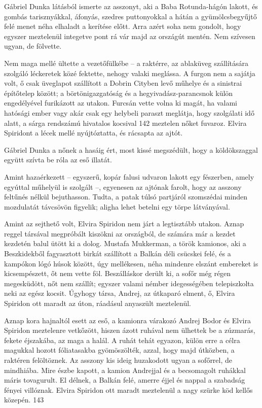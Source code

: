 \documentclass{IEEEtran}
\begin{document}
Gábriel Dunka látásból ismerte az asszonyt, aki a Baba Rotunda-hágón lakott,
és gombás tarisznyákkal, áfonyás, szedres puttonyokkal a hátán a
gyümölcsbegyűjtő felé menet néha elhaladt a kerítése előtt. Arra azért soha
nem gondolt, hogy egyszer meztelenül integetve pont rá vár majd az országút
mentén. Nem szívesen ugyan, de fölvette.

Nem maga mellé ültette a vezetőfülkébe – a raktérre, az ablaküveg szállítására
szolgáló léckeretek közé fektette, nehogy valaki meglássa. A furgon nem a
sajátja volt, ő csak üveglapot szállított a Dobrin Cityben levő műhelye és a
sinistrai építőtelep között; a börtönigazgatóság és a hegyivadász-parancsnok
külön engedélyével furikázott az utakon. Furcsán vette volna ki magát, ha
valami hatósági ember vagy akár csak egy helybeli paraszt meglátja, hogy
szolgálati idő alatt, a sárga rendszámú hivatalos kocsival 142 meztelen nőket
fuvaroz. Elvira Spiridont a lécek mellé nyújtóztatta, és rácsapta az ajtót.

Gábriel Dunka a nőnek a hasáig ért, most kissé megszédült, hogy a
köldökszaggal együtt szívta be róla az eső illatát.

Amint hazaérkezett – egyszerű, kopár falusi udvaron lakott egy fészerben,
amely egyúttal műhelyül is szolgált –, egyenesen az ajtónak farolt, hogy az
asszony feltűnés nélkül bejuthasson. Tudta, a patak túlsó partjáról szomszédai
minden mozdulatát távcsövön figyelik; aligha lehet betelni egy törpe
látványával.

Amint az sejthető volt, Elvira Spiridon nem járt a legtisztább utakon. Aznap
reggel társával megpróbált kiszökni az országból, de számára már a kezdet
kezdetén balul ütött ki a dolog. Mustafa Mukkerman, a török kamionos, aki a
Beszkidekből fagyasztott birkát szállított a Balkán déli csücskei felé, és a
kampókon lógó húsok között, úgy mellékesen, néha mindenre elszánt embereket is
kicsempészett, őt nem vette föl. Beszálláskor derült ki, a sofőr még régen
megesküdött, nőt nem szállít; egyszer valami némber idegességében
telepiszkolta neki az egész kocsit. Úgyhogy társa, Andrej, az útkaparó elment,
ő, Elvira Spiridon ott maradt az úton, ráadásul anyaszült meztelenül.

Aznap kora hajnaltól esett az eső, a kamionra várakozó Andrej Bodor és Elvira
Spiridon meztelenre vetkőzött, hiszen ázott ruhával nem ülhettek be a
zúzmarás, fekete éjszakába, az maga a halál. A ruhát tehát egyazon, külön erre
a célra magukkal hozott fóliatasakba gyömöszölték, azzal, hogy majd útközben,
a raktéren felöltöznek. Az asszony kis ideig huzakodott ugyan a sofőrrel, de
mindhiába. Mire észbe kapott, a kamion Andrejjal és a becsomagolt ruhákkal
máris tovagurult. El délnek, a Balkán felé, amerre éjjel és nappal a szabadság
fényei villóznak. Elvira Spiridon ott maradt meztelenül a nagy szürke köd
kellős közepén.
143
\end{document}
